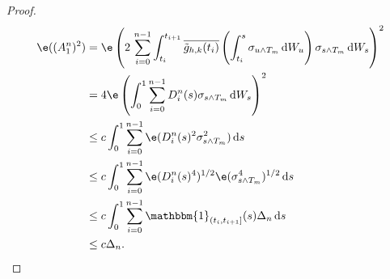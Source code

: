 \begin{proof}
\begin{align}
  \e((A_1^n)^2)  &= \e\left(2\,\sumin\int_{t_i}^{t_{i+1} }\btghki\left(\int_{t_i}^{s} \sigma_{u \wedge T_m}\D W_u\right)\sigma_{s\wedge T_m} \D W_s\right)^2\notag \\
  & = 4 \e\left(\int_0^{1 }\sumin D_i^n(s) \sigma_{s\wedge T_m} \D W_s\right)^2 \notag \\
  & \le c \int_0^{1 }\sumin\e( D_i^n(s)^2 \sigma_{s\wedge T_m}^2) \D s  \notag \\
  & \le c \int_0^{1 }\sumin\e( D_i^n(s)^4)^{1/2} \e( \sigma_{s\wedge T_m}^4)^{1/2} \D s  \notag \\
  & \le  c \int_0^{1 }\sumin \mathbbm{1}_{(t_i, t_{i+1}]}(s)\Delta_n  \D s  \notag \\
  & \le  c \Delta_n.  \notag 
  \label{}
\end{align}
\begin{comment}
We now note that since $4 \int_0^{1 }\left(\sumin D_i^n(s) \sigma_s\right)^2 \D s$ is increasing finite and continuous, it is locally bounded and therefore locally integrable. It is thus the case that the process defined by, $A_1^n(t) := 2 \int_0^{t}\sumin D_i^n(s) \sigma_s \D W_s$, $t \in \domain$, is a continuous local martingale. As such  $A_1^n(\cdot)$ is locally square integrable with predictable quadratic variation given by    $\langle A_1^n(\cdot) \rangle := 4 \int_0^{\cdot }\left(\sumin D_i^n(s) \sigma_s\right)^2 \D s$. Now let $\{T_n\}$ be a localizing sequence for $A_1^n(\cdot)$, then for any bounded stopping time $T$, we have
$  \e((A_1^n(T\wedge T_n) )^2) = \e(\langle A_1^n (\cdot) \rangle_{T \wedge T_n})$. By Fatou's Lemma $  \e( (A_1^n(T) )^2)  \le \e(\langle A_1^n(\cdot) \rangle_T)$. In other words $(A_1^n(\cdot))^2$ is L-dominated\footnote{The Lenglart domination property is defined in \citet[I.3.29]{Jacod2003}. } by $\langle A_1^n(\cdot) \rangle$.   

Now given $\varepsilon >  0$, we have by Lenglart's inequality for predictable majorants that 
  \begin{align}
    P(A_1^n \ge \varepsilon)  & \le P(\sup_s (A_1^n(s))^2 \ge \varepsilon^2)\notag\\
    & \le \varepsilon^{-2} \e(\langle A_1^n(\cdot) \rangle_1 \wedge \gamma) + P(\langle A_1^n(\cdot) \rangle_1 \le \gamma),
  \end{align}
where $\gamma > 0$ is arbitrary. Because $\langle A_1^n(\cdot) \rangle_1$ is almost surely finite, letting $\gamma \downarrow 0$ simultaneousy as $n \uparrow \infty$, it is easily seen that $A^n_1$ tends to zero in probability.
\end{comment}
\begin{comment}
\begin{align}
  T_c = \inf \{ t >0 : \sigma^2(t) > c \} \wedge 1\notag.
  \label{}
\end{align}
By the regularity assumption on $\sigma$, $\p(T_c < 1)$ can be made arbitrarily small by taking $c$ sufficiently large.  


\end{comment}
\end{proof}
